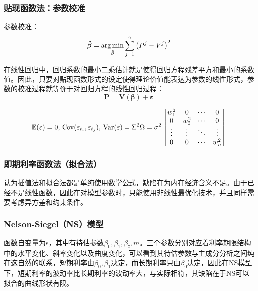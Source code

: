 \documentclass[11pt]{article}
\begin{document}
\subsubsection*{贴现函数法：参数校准}

参数校准：
\begin{equation*}
	\bm{\hat{\beta}} = \operatorname*{arg\,min}_{\hat{\beta}} \sum^n_{j=1}\left(P^j - V^j\right)^2
\end{equation*}

在线性回归中，回归系数的最小二乘估计就是使得回归方程残差平方和最小的系数值。因此，只要对贴现函数形式的设定使得理论价值能表达为参数的线性形式，参数的校准过程就等价于对回归方程的线性回归过程：
\begin{equation*}
	\mathbf{P=V(\bm{\beta})+\bm{\varepsilon}}
\end{equation*}

\begin{equation*}
    \mathbb{E}(\varepsilon)=0,\,\operatorname{Cov}(\varepsilon_{t_i},\varepsilon_{t_j}),\,\operatorname{Var}(\varepsilon) = \Sigma^2\Omega = \sigma^2
    \begin{bmatrix}
        w_1^2 & 0 & \cdots & 0 \\
        0 & w_2^2 & \cdots & 0 \\
        \vdots & \vdots & \ddots & \vdots \\
        0 & 0 & \cdots & w_n^2
    \end{bmatrix}
\end{equation*}

\subsubsection{即期利率函数法（拟合法）}

认为插值法和拟合法都是单纯使用数学公式，缺陷在为内在经济含义不足。由于已经不是线性函数，因此在对模型参数时，只能使用非线性最优化技术，并且同样需要考虑异方差和约束条件。

\subsubsection*{Nelson-Siegel（NS）模型}

函数自变量为s，其中有待估参数$\beta_0,\beta_1,\beta_2,m$。三个参数分别对应着利率期限结构中的水平变化、斜率变化以及曲度变化，可以看到其待估参数与主成分分析之间纯在这自然的联系，短期利率由$\beta_0,\beta_1$决定，而长期利率只由$\beta_0$决定，因此在NS模型下，短期利率的波动率比长期利率的波动率大，与实际相符，其缺陷在于NS可以拟合的曲线形状有限。
\end{document}
